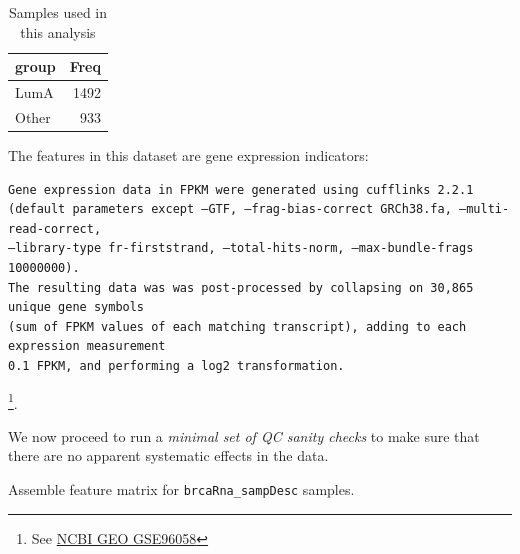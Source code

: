 \documentclass[
]{book}
\begin{document}
\begin{table}

\caption{\label{tab:brcaRna-preproc-subsetSamples}Samples used in this analysis}
\centering
\begin{tabular}[t]{l|r}
\hline
group & Freq\\
\hline
LumA & 1492\\
\hline
Other & 933\\
\hline
\end{tabular}
\end{table}

The features in this dataset are gene expression indicators:

\begin{verbatim}
Gene expression data in FPKM were generated using cufflinks 2.2.1 
(default parameters except –GTF, –frag-bias-correct GRCh38.fa, –multi-read-correct, 
–library-type fr-firststrand, –total-hits-norm, –max-bundle-frags 10000000). 
The resulting data was was post-processed by collapsing on 30,865 unique gene symbols 
(sum of FPKM values of each matching transcript), adding to each expression measurement 
0.1 FPKM, and performing a log2 transformation.
\end{verbatim}

\footnote{See \href{https://www.ncbi.nlm.nih.gov/geo/query/acc.cgi?acc=GSE96058}{NCBI GEO GSE96058}}.

We now proceed to run a \emph{minimal set of QC sanity checks} to make sure that
there are no apparent systematic effects in the data.

Assemble feature matrix for \texttt{brcaRna\_sampDesc} samples.
\end{document}
